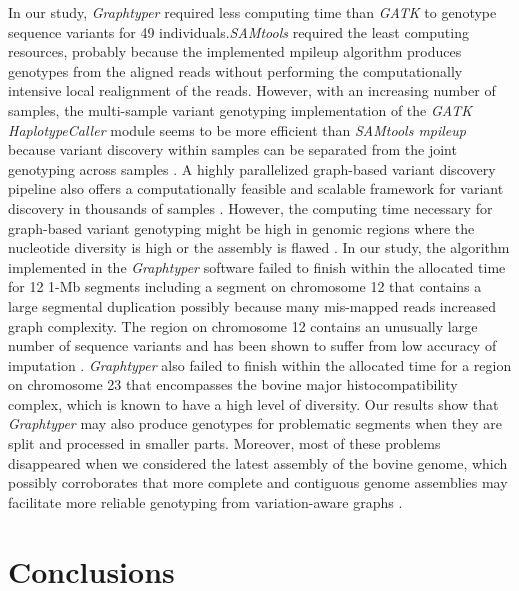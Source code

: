 \documentclass[../main.tex]{subfiles}
\begin{document}
In our study, \emph{Graphtyper} required less computing time than \emph{GATK} to genotype sequence variants for 49 individuals.\emph{SAMtools} required the least computing resources, probably because the implemented mpileup algorithm produces genotypes from the aligned reads without performing the computationally intensive local realignment of the reads. However, with an increasing number of samples, the multi-sample variant genotyping implementation of the \emph{GATK HaplotypeCaller} module seems to be more efficient than \emph{SAMtools mpileup} because variant discovery within samples can be separated from the joint genotyping across samples \citep{poplin2018scaling,vander2018best}. A highly parallelized graph-based variant discovery pipeline also offers a computationally feasible and scalable framework for variant discovery in thousands of samples \citep{eggertsson2017graphtyper}. However, the computing time necessary for graph-based variant genotyping might be high in genomic regions where the nucleotide diversity is high or the assembly is flawed \citep{sibbesen2018accurate,koren2013reducing}. In our study, the algorithm implemented in the \emph{Graphtyper} software failed to finish within the allocated time for 12 1-Mb segments including a segment on chromosome 12 that contains a large segmental duplication \citep{pausch2017evaluation,liu2009analysis,bickhart2012copy} possibly because many mis-mapped reads increased graph complexity. The region on chromosome 12 contains an unusually large number of sequence variants and has been shown to suffer from low accuracy of imputation \citep{pausch2017evaluation}. \emph{Graphtyper} also failed to finish within the allocated time for a region on chromosome 23 that encompasses the bovine major histocompatibility complex, which is known to have a high level of diversity. Our results show that \emph{Graphtyper} may also produce genotypes for problematic segments when they are split and processed in smaller parts. Moreover, most of these problems disappeared when we considered the latest assembly of the bovine genome, which possibly corroborates that more complete and contiguous genome assemblies may facilitate more reliable genotyping from variation-aware graphs \citep{li2014toward,guo2017improvements}.

\section{Conclusions}
\end{document}
